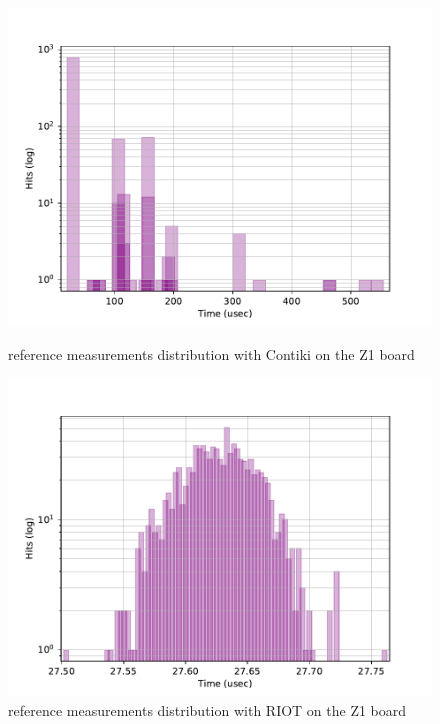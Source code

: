 \begin{figure}[!ht]
        \centering
        \includegraphics[scale=.7]{assets/reference-value-contiki-z1.pdf}
        \caption{reference measurements distribution with Contiki on the Z1 board\label{fig:reference-value-contiki-z1}}
        \centering
        \includegraphics[scale=.7]{assets/reference-value-riot-z1.pdf}
        \caption{reference measurements distribution with RIOT on the Z1 board\label{fig:reference-value-riot-z1}}
\end{figure}

